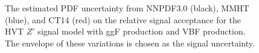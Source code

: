 \begin{figure}[htb]
\centering
{}
\caption[Parton distribution function uncertainties]{The estimated PDF uncertainty from \textsc{NNPDF3.0} (black), \textsc{MMHT} (blue), and \textsc{CT14} (red) on the relative signal acceptance for the HVT $Z'$ signal model with \protect{} ggF production and \protect{} VBF production. The envelope of these variations is chosen as the signal uncertainty.}
\label{fig:pdf}
\end{figure}

